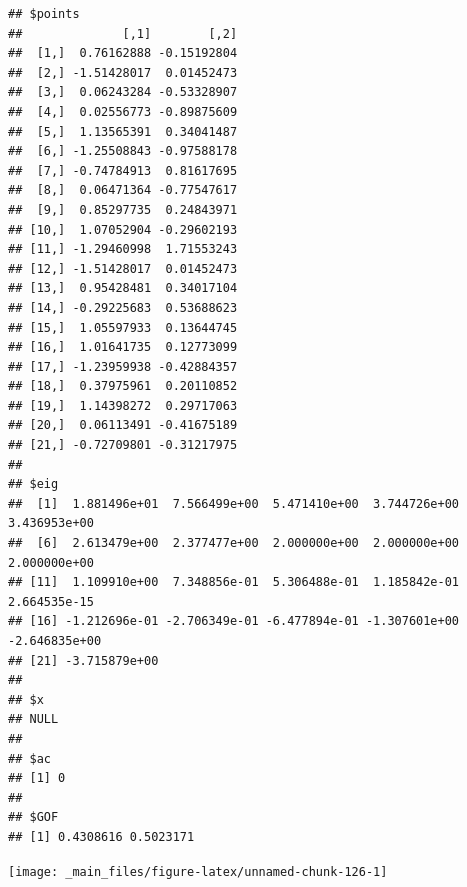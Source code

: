 \documentclass[
  notitlepage,
  onecolumn,
  openany]{book}
\newenvironment{Shaded}{\begin{snugshade}}{\end{snugshade}}
\newcommand{\AttributeTok}[1]{\textcolor[rgb]{0.77,0.63,0.00}{#1}}
\newcommand{\CommentTok}[1]{\textcolor[rgb]{0.56,0.35,0.01}{\textit{#1}}}
\newcommand{\DecValTok}[1]{\textcolor[rgb]{0.00,0.00,0.81}{#1}}
\newcommand{\FunctionTok}[1]{\textcolor[rgb]{0.00,0.00,0.00}{#1}}
\newcommand{\NormalTok}[1]{#1}
\newcommand{\SpecialCharTok}[1]{\textcolor[rgb]{0.00,0.00,0.00}{#1}}
\newcommand{\StringTok}[1]{\textcolor[rgb]{0.31,0.60,0.02}{#1}}
\begin{document}
\begin{verbatim}
## $points
##              [,1]        [,2]
##  [1,]  0.76162888 -0.15192804
##  [2,] -1.51428017  0.01452473
##  [3,]  0.06243284 -0.53328907
##  [4,]  0.02556773 -0.89875609
##  [5,]  1.13565391  0.34041487
##  [6,] -1.25508843 -0.97588178
##  [7,] -0.74784913  0.81617695
##  [8,]  0.06471364 -0.77547617
##  [9,]  0.85297735  0.24843971
## [10,]  1.07052904 -0.29602193
## [11,] -1.29460998  1.71553243
## [12,] -1.51428017  0.01452473
## [13,]  0.95428481  0.34017104
## [14,] -0.29225683  0.53688623
## [15,]  1.05597933  0.13644745
## [16,]  1.01641735  0.12773099
## [17,] -1.23959938 -0.42884357
## [18,]  0.37975961  0.20110852
## [19,]  1.14398272  0.29717063
## [20,]  0.06113491 -0.41675189
## [21,] -0.72709801 -0.31217975
## 
## $eig
##  [1]  1.881496e+01  7.566499e+00  5.471410e+00  3.744726e+00  3.436953e+00
##  [6]  2.613479e+00  2.377477e+00  2.000000e+00  2.000000e+00  2.000000e+00
## [11]  1.109910e+00  7.348856e-01  5.306488e-01  1.185842e-01  2.664535e-15
## [16] -1.212696e-01 -2.706349e-01 -6.477894e-01 -1.307601e+00 -2.646835e+00
## [21] -3.715879e+00
## 
## $x
## NULL
## 
## $ac
## [1] 0
## 
## $GOF
## [1] 0.4308616 0.5023171
\end{verbatim}

\begin{Shaded}
\end{Shaded}

\begin{center}\texttt{[image: \_main\_files/figure-latex/unnamed-chunk-126-1]} \end{center}
\end{document}
